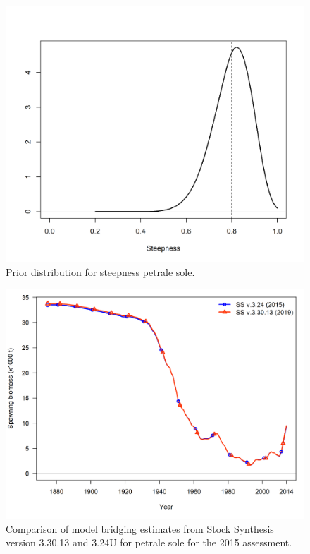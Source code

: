 \documentclass[12pt,]{article}
\begin{document}
\FloatBarrier

\begin{figure}
\centering
\includegraphics{Figures/h_prior.png}
\caption{Prior distribution for steepness petrale sole.
\label{fig:h_prior}}
\end{figure}

\FloatBarrier

\begin{figure}
\centering
\includegraphics{Figures/compare1_spawnbio.png}
\caption{Comparison of model bridging estimates from Stock Synthesis
version 3.30.13 and 3.24U for petrale sole for the 2015 assessment.
\label{fig:bridge}}
\end{figure}
\end{document}
